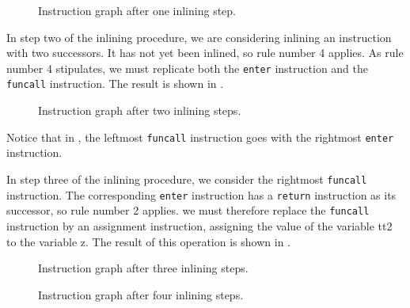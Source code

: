 \begin{figure}
\begin{center}
\end{center}
\caption{\label{fig33}
Instruction graph after one inlining step.}
\end{figure}

In step two of the inlining procedure, we are considering inlining an
instruction with two successors.  It has not yet been inlined, so rule
number 4 applies.  As rule number 4 stipulates, we must replicate both
the \texttt{enter} instruction and the \texttt{funcall} instruction.
The result is shown in .

\begin{figure}
\begin{center}
\end{center}
\caption{\label{fig34}
Instruction graph after two inlining steps.}
\end{figure}

Notice that in , the leftmost \texttt{funcall}
instruction goes with the rightmost \texttt{enter} instruction.

In step three of the inlining procedure, we consider the rightmost
\texttt{funcall} instruction.  The corresponding \texttt{enter}
instruction has a \texttt{return} instruction as its successor, so
rule number 2 applies.  we must therefore replace the \texttt{funcall}
instruction by an assignment instruction, assigning the value of the
variable tt2 to the variable z.  The result of this operation is shown
in .

\begin{figure}
\begin{center}
\end{center}
\caption{\label{fig35}
Instruction graph after three inlining steps.}
\end{figure}

\begin{figure}
\begin{center}
\end{center}
\caption{\label{fig36}
Instruction graph after four inlining steps.}
\end{figure}


